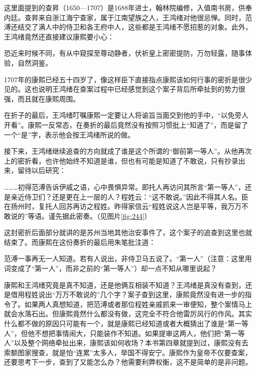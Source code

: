 
这里面提到的查昇（1650—1707）是1688年进士，翰林院编修，入值南书房，供奉内廷。查昇来自浙江海宁查家，属于江南望族之人，王鸿绪对他很忌惮。同时，范溥还结交了满人中的侍卫和各王府中人，这些都是王鸿绪不愿招惹的对象。此外，王鸿绪竟然还直接建议康熙要小心：



\begin{bookquote}恐近来时候不同，有从中窥探至尊动静者，伏祈皇上密密提防，万勿轻露，随事体验，自然洞鉴。\end{bookquote}


1707年的康熙已经五十四岁了，像这样臣下直接指点康熙该如何行事的密折是很少见的。这也说明王鸿绪在查案过程中已经感觉到这个案子背后所牵扯到的势力很强，而且就在康熙周围。



在折子的最后，王鸿绪叮嘱康熙一定要让人将谕旨当面交到他的手中，“以免旁人开看”。康熙一反常态，在奏折的最后竟然没有按照习惯批上“知道了”，而是留了一个“是”字，表示他会按王鸿绪所说的做。



接下来，王鸿绪继续追查的方向就成了谁是这个所谓的“御前第一等人”。从他再次上的密折看，也许他始终不知道是谁，但也有可能是知道了不敢说，只有抄录出来，留待以后研究：



\begin{bookquote}………初得范溥告诉伊戚之语，心中畏惧异常。即托人再访问其所言“第一等人”，还是亲近侍卫们？还是更在上一层的人？程姓云：“这不敢说。”因此不得其人名。臣在扬州时，复托人回苏再访之程姓。昨得家信云“程姓说这人岂是平等，我万万不敢说的”等语。谨先据此密奏。（见图片\ref{fig:244}）\end{bookquote}


这封密折后面部分就讲的是苏州当地其他治安事件了，这个案子的追查到这里也就结束了。而康熙在这份奏折的最后用朱笔批注道：



\begin{bookquote}范溥一事再无一人知道。若有人说出，非侍卫马五说了。“第一人”（注意：这里用词变成了“第一人”，而非之前的“第一等人”）却一点不知从哪里说起？\end{bookquote}


康熙和王鸿绪究竟是真不知道，还是他俩互相装不知道？王鸿绪是真没有查到，还是借用程姓说出“万万不敢说的”几个字？案子查到这里，康熙竟然没有进一步的指令了。如果两人真想知道，把范溥或者那位程姓亲戚抓来一审便知，整个案情马上就会水落石出。但康熙竟然什么都没有做，这完全不符合他雷厉风行的作风。其实什么都不做的原因只可能有一个，就是康熙已经知道或者大概猜出了谁是“第一等人”，但他不想把事情闹大，只能装作不知道。如果提审这两人，他们把“第一等人”以及整个网络牵扯出来，康熙该如何收场？本书第四章就提到过，康熙没有去索额图家搜查，就是怕“连累”太多人，举国不得安宁。康熙作为皇帝不仅要查案，还要思考下一步，查到了又能怎么办？他需要利弊权衡，这不是简单的是非问题。


